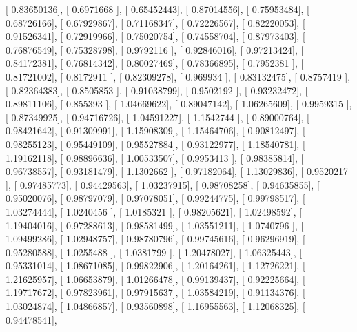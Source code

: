 \documentclass{article}
\begin{document}
       [ 0.83650136],
       [ 0.6971668 ],
       [ 0.65452443],
       [ 0.87014556],
       [ 0.75953484],
       [ 0.68726166],
       [ 0.67929867],
       [ 0.71168347],
       [ 0.72226567],
       [ 0.82220053],
       [ 0.91526341],
       [ 0.72919966],
       [ 0.75020754],
       [ 0.74558704],
       [ 0.87973403],
       [ 0.76876549],
       [ 0.75328798],
       [ 0.9792116 ],
       [ 0.92846016],
       [ 0.97213424],
       [ 0.84172381],
       [ 0.76814342],
       [ 0.80027469],
       [ 0.78366895],
       [ 0.7952381 ],
       [ 0.81721002],
       [ 0.8172911 ],
       [ 0.82309278],
       [ 0.969934  ],
       [ 0.83132475],
       [ 0.8757419 ],
       [ 0.82364383],
       [ 0.8505853 ],
       [ 0.91038799],
       [ 0.9502192 ],
       [ 0.93232472],
       [ 0.89811106],
       [ 0.855393  ],
       [ 1.04669622],
       [ 0.89047142],
       [ 1.06265609],
       [ 0.9959315 ],
       [ 0.87349925],
       [ 0.94716726],
       [ 1.04591227],
       [ 1.1542744 ],
       [ 0.89000764],
       [ 0.98421642],
       [ 0.91309991],
       [ 1.15908309],
       [ 1.15464706],
       [ 0.90812497],
       [ 0.98255123],
       [ 0.95449109],
       [ 0.95527884],
       [ 0.93122977],
       [ 1.18540781],
       [ 1.19162118],
       [ 0.98896636],
       [ 1.00533507],
       [ 0.9953413 ],
       [ 0.98385814],
       [ 0.96738557],
       [ 0.93181479],
       [ 1.1302662 ],
       [ 0.97182064],
       [ 1.13029836],
       [ 0.9520217 ],
       [ 0.97485773],
       [ 0.94429563],
       [ 1.03237915],
       [ 0.98708258],
       [ 0.94635855],
       [ 0.95020076],
       [ 0.98797079],
       [ 0.97078051],
       [ 0.99244775],
       [ 0.99798517],
       [ 1.03274444],
       [ 1.0240456 ],
       [ 1.0185321 ],
       [ 0.98205621],
       [ 1.02498592],
       [ 1.19404016],
       [ 0.97288613],
       [ 0.98581499],
       [ 1.03551211],
       [ 1.0740796 ],
       [ 1.09499286],
       [ 1.02948757],
       [ 0.98780796],
       [ 0.99745616],
       [ 0.96296919],
       [ 0.95280588],
       [ 1.0255488 ],
       [ 1.0381799 ],
       [ 1.20478027],
       [ 1.06325443],
       [ 0.95331014],
       [ 1.08671085],
       [ 0.99822906],
       [ 1.20164261],
       [ 1.12726221],
       [ 1.21625957],
       [ 1.06653879],
       [ 1.01266478],
       [ 0.99139437],
       [ 0.92225664],
       [ 1.19717672],
       [ 0.97823961],
       [ 0.97915637],
       [ 1.03584219],
       [ 0.91134376],
       [ 1.03024874],
       [ 1.04866857],
       [ 0.93560898],
       [ 1.16955563],
       [ 1.12068325],
       [ 0.94478541],
\end{document}
